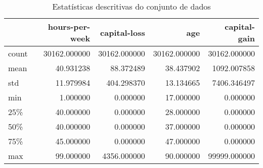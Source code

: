 \begin{table}
\centering
\caption{Estatísticas descritivas do conjunto de dados}
\label{tbl:descriptive_statistics}
\begin{tabular}{lrrrr}
\toprule
{} &  hours-per-week &  capital-loss &           age &  capital-gain \\
\midrule
count &    30162.000000 &  30162.000000 &  30162.000000 &  30162.000000 \\
mean  &       40.931238 &     88.372489 &     38.437902 &   1092.007858 \\
std   &       11.979984 &    404.298370 &     13.134665 &   7406.346497 \\
min   &        1.000000 &      0.000000 &     17.000000 &      0.000000 \\
25\%   &       40.000000 &      0.000000 &     28.000000 &      0.000000 \\
50\%   &       40.000000 &      0.000000 &     37.000000 &      0.000000 \\
75\%   &       45.000000 &      0.000000 &     47.000000 &      0.000000 \\
max   &       99.000000 &   4356.000000 &     90.000000 &  99999.000000 \\
\bottomrule
\end{tabular}
\end{table}
